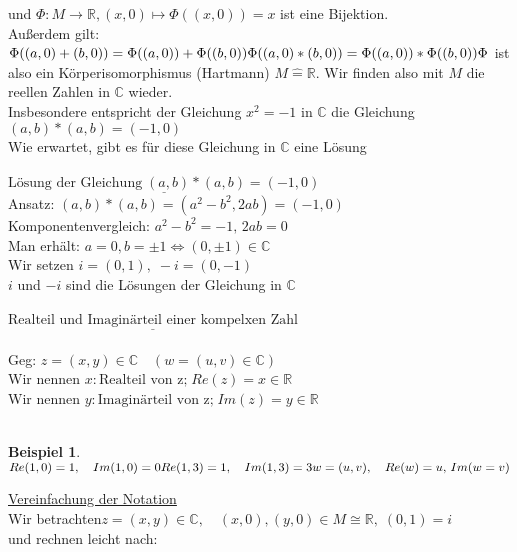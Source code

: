 \documentclass{article}
\theoremstyle{definition}
\theoremstyle{definition}
\newtheorem{example}{Beispiel}[theorem]
\begin{document}
und $\Phi :M\rightarrow\mathbb{R},(x,0)\mapsto \Phi((x,0))=x$ ist eine Bijektion.\\
Außerdem gilt:\\
$\Phi ((a,0)+(b,0))=\Phi ((a,0))+\Phi ((b,0))\\
\Phi((a,0)\ast (b,0)) = \Phi((a,0))\ast \Phi((b,0))\\
\Phi$ ist also ein Körperisomorphismus (Hartmann) $M\widehat{=}\mathbb{R}$.
Wir finden also mit $M$ die reellen Zahlen in $\mathbb{C}$ wieder.\\
Insbesondere entspricht der Gleichung $x^{2}=-1$ in $\mathbb{C}$ die Gleichung\\
$(a,b)\ast (a,b)=(-1,0)$\\
Wie erwartet, gibt es für diese Gleichung in $\mathbb{C}$ eine Lösung\\
\\
$\underline{\text{Lösung der Gleichung}\;(a,b)\ast (a,b)=(-1,0)}$\\
Ansatz: $(a,b)\ast (a,b) = (a^{2}-b^{2},2ab)=(-1,0)$\\
Komponentenvergleich: $a^{2}-b^{2}=-1,\,2ab=0$\\
Man erhält: $a=0, b=\pm 1\Leftrightarrow (0,\pm 1)\in\mathbb{C}$\\
Wir setzen $i=(0,1),\; -i=(0,-1)$\\
$i$ und $-i$ sind die Lösungen der Gleichung in $\mathbb{C}$\\
\\
$\underline{\text{Realteil und Imaginärteil einer kompelxen Zahl}}$\\
\\
Geg: $z=(x,y)\in \mathbb{C}\quad (w=(u,v)\in \mathbb{C})$\\
Wir nennen $x:\text{Realteil von z;}\; Re(z)=x\in\mathbb{R}$\\
Wir nennen $y:\text{Imaginärteil von z;}\; Im(z)=y\in\mathbb{R}$\\
\\
\setcounter{example}{1}
\begin{example}\,\\
    $Re(1,0)=1,\quad Im(1,0)=0\\
    Re(1,3)=1,\quad Im(1,3)=3\\
    w=(u,v),\quad Re(w)=u,\, Im(w=v)$
\end{example}
\underline{Vereinfachung der Notation}\\
Wir betrachten\quad $z=(x,y)\in\mathbb{C},\quad (x,0),(y,0)\in M\cong\mathbb{R},\;(0,1)=i$\\
und rechnen leicht nach:\\
\end{document}

